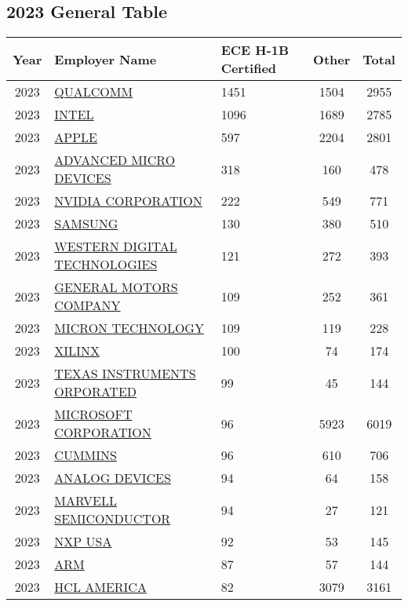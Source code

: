 \documentclass{article}%
\begin{document}
\subsection{2023 General Table}%
\label{subsec:2023GeneralTable}%
\begin{longtable}{c|p{20em}|p{5em}|c|c}%
\hline%
Year&Employer Name&ECE \newline%
 H{-}1B \newline%
 Certified&Other&Total\\%
\hline%
2023&\hyperref[subsec:QUALCOMM]{QUALCOMM}&1451&1504&2955\\%
\hline%
2023&\hyperref[subsec:INTEL]{INTEL}&1096&1689&2785\\%
\hline%
2023&\hyperref[subsec:APPLE]{APPLE}&597&2204&2801\\%
\hline%
2023&\hyperref[subsec:ADVANCEDMICRODEVICES]{ADVANCED MICRO DEVICES}&318&160&478\\%
\hline%
2023&\hyperref[subsec:NVIDIACORPORATION]{NVIDIA CORPORATION}&222&549&771\\%
\hline%
2023&\hyperref[subsec:SAMSUNG]{SAMSUNG}&130&380&510\\%
\hline%
2023&\hyperref[subsec:WESTERNDIGITALTECHNOLOGIES]{WESTERN DIGITAL TECHNOLOGIES}&121&272&393\\%
\hline%
2023&\hyperref[subsec:GENERALMOTORSCOMPANY]{GENERAL MOTORS COMPANY}&109&252&361\\%
\hline%
2023&\hyperref[subsec:MICRONTECHNOLOGY]{MICRON TECHNOLOGY}&109&119&228\\%
\hline%
2023&\hyperref[subsec:XILINX]{XILINX}&100&74&174\\%
\hline%
2023&\hyperref[subsec:TEXASINSTRUMENTSORPORATED]{TEXAS INSTRUMENTS ORPORATED}&99&45&144\\%
\hline%
2023&\hyperref[subsec:MICROSOFTCORPORATION]{MICROSOFT CORPORATION}&96&5923&6019\\%
\hline%
2023&\hyperref[subsec:CUMMINS]{CUMMINS}&96&610&706\\%
\hline%
2023&\hyperref[subsec:ANALOGDEVICES]{ANALOG DEVICES}&94&64&158\\%
\hline%
2023&\hyperref[subsec:MARVELLSEMICONDUCTOR]{MARVELL SEMICONDUCTOR}&94&27&121\\%
\hline%
2023&\hyperref[subsec:NXPUSA]{NXP USA}&92&53&145\\%
\hline%
2023&\hyperref[subsec:ARM]{ARM}&87&57&144\\%
\hline%
2023&\hyperref[subsec:HCLAMERICA]{HCL AMERICA}&82&3079&3161\\%
\hline%

\end{longtable}
\end{document}
